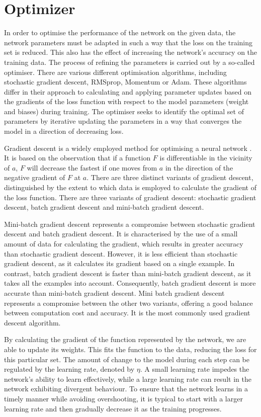 \documentclass[
a4paper, 
12pt,
grayscalebody, %
abstract=on,
twoside, BCOR10mm, 12pt, DIV13,headinclude, footexclude, final, abstracton, openright
]{ibireprt}
\numberwithin{equation}{chapter}
\numberwithin{table}{chapter}
\numberwithin{figure}{chapter}
\numberwithin{algorithm}{chapter}
\numberwithin{example}{chapter}
\numberwithin{example}{chapter}
\begin{document}
\section{Optimizer}
In order to optimise the performance of the network on the given data, the network parameters must be adapted in such a way that the loss on the training set is reduced. This also has the effect of increasing the network's accuracy on the training data. The process of refining the parameters is carried out by a so-called optimiser. There are various different optimisation algorithms, including stochastic gradient descent, RMSprop, Momentum or Adam. These algorithms differ in their approach to calculating and applying parameter updates based on the gradients of the loss function with respect to the model parameters (weight and biases) during training. The optimiser seeks to identify the optimal set of parameters by iterative updating the parameters in a way that converges the model in a direction of decreasing loss.

Gradient descent is a widely employed method for optimising a neural network \citep{Ruder2016}.  It is based on the observation that if a function $F$ is differentiable in the vicinity of $a$, $F$ will decrease the fastest if one moves from $a$ in the direction of the negative gradient of $F$ at $a$. There are three distinct variants of gradient descent, distinguished by the extent to which data is employed to calculate the gradient of the loss function. There are three variants of gradient descent: stochastic gradient descent, batch gradient descent and mini-batch gradient descent. 

Mini-batch gradient descent represents a compromise between stochastic gradient descent and batch gradient descent. It is characterised by the use of a small amount of data for calculating the gradient, which results in greater accuracy than stochastic gradient descent. However, it is less efficient than stochastic gradient descent, as it calculates its gradient based on a single example. In contrast, batch gradient descent is faster than mini-batch gradient descent, as it takes all the examples into account. Consequently, batch gradient descent is more accurate than mini-batch gradient descent. Mini batch gradient descent represents a compromise between the other two variants, offering a good balance between computation cost and accuracy. It is the most commonly used gradient descent algorithm.

By calculating the gradient of the function represented by the network, we are able to update its weights. This fits the function to the data, reducing the loss for this particular set. The amount of change to the model during each step can be regulated by the learning rate, denoted by $\eta$. A small learning rate impedes the network's ability to learn effectively, while a large learning rate can result in the network exhibiting divergent behaviour. To ensure that the network learns in a timely manner while avoiding overshooting, it is typical to start with a larger learning rate and then gradually decrease it as the training progresses.
  
\end{document}
